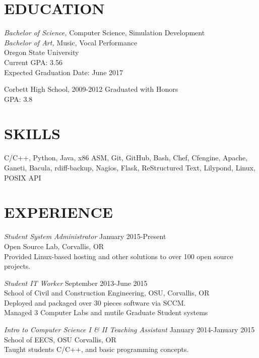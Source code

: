 \documentclass[line,margin]{res}
\begin{document}
\address{(503)-758-6952, fahlmantaylor@gmail.com, tfahl.com}
\address{github.com/fahlmant, irc: recyclops or fahlmant on freenode}
\begin{resume}
 
\section{EDUCATION}
                    {\sl Bachelor of Science,} Computer Science, Simulation Development \\
                    {\sl Bachelor of Art,} Music, Vocal Performance \\
                    Oregon State University\\
                    Current GPA: 3.56\\
                    Expected Graduation Date: June 2017 
                    
                    Corbett High School, 2009-2012
                    Graduated with Honors\\
                    GPA: 3.8
\section{SKILLS}
                    C/C++, Python, Java, x86 ASM, Git, GitHub, Bash, Chef, Cfengine, Apache, Ganeti, Bacula, rdiff-backup,
                    Nagios, Flask, ReStructured Text, Lilypond, Linux, POSIX API
\section{EXPERIENCE}
                    {\sl Student System Administrator} \hfill January 2015-Present \\
                    Open Source Lab, 
                    Corvallis, OR\\
                    Provided Linux-based hosting and other solutions to over 100 open source projects.

                    {\sl Student IT Worker} \hfill September 2013-June 2015 \\
                    School of Civil and Construction Engineering, OSU, 
                    Corvallis, OR\\ 
                    Deployed and packaged over 30 pieces software via SCCM.\\
                    Managed 3 Computer Labs and mutile Graduate Student systems

                    {\sl Intro to Computer Science I \& II Teaching Assistant} \hfill January 2014-January 2015\\
                    School of EECS, OSU
                    Corvallis, OR\\
                    Taught students C/C++, and basic programming concepts.
                    

\end{resume}
\end{document}
